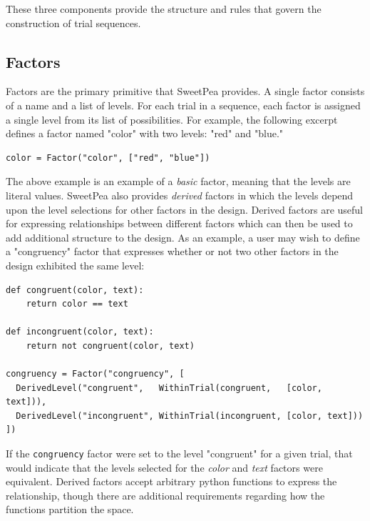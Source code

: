 These three components provide the structure and rules that govern the construction of trial sequences.

\subsection{Factors}

Factors are the primary primitive that SweetPea provides. A single factor consists of a name and a list of levels. For each trial in a sequence, each factor is assigned a single level from its list of possibilities. For example, the following excerpt defines a factor named "color" with two levels: "red" and "blue."

\begin{verbatim}
color = Factor("color", ["red", "blue"])
\end{verbatim}

The above example is an example of a \textit{basic} factor, meaning that the levels are literal values. SweetPea also provides \textit{derived} factors in which the levels depend upon the level selections for other factors in the design. Derived factors are useful for expressing relationships between different factors which can then be used to add additional structure to the design. As an example, a user may wish to define a "congruency" factor that expresses whether or not two other factors in the design exhibited the same level:

\begin{verbatim}
def congruent(color, text):
    return color == text

def incongruent(color, text):
    return not congruent(color, text)

congruency = Factor("congruency", [
  DerivedLevel("congruent",   WithinTrial(congruent,   [color, text])),
  DerivedLevel("incongruent", WithinTrial(incongruent, [color, text]))
])
\end{verbatim}

If the \texttt{congruency} factor were set to the level "congruent" for a given trial, that would indicate that the levels selected for the \textit{color} and \textit{text} factors were equivalent. Derived factors accept arbitrary python functions to express the relationship, though there are additional requirements regarding how the functions partition the space.

